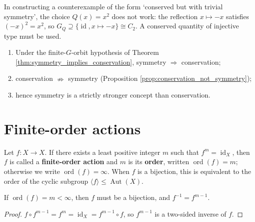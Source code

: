 \begin{remark}\label{rem:counterexample_fix}
In constructing a counterexample of the form `conserved but with trivial symmetry', the choice $Q(x)=x^2$ does not work: the reflection $x\mapsto -x$ satisfies $(-x)^2=x^2$, so $G_Q\supseteq\{\operatorname{id},x\mapsto -x\}\cong C_2$. A conserved quantity of injective type must be used.
\end{remark}

\begin{corollary}\label{cor:conservation_symmetry_hierarchy}
\begin{enumerate}[label=(\roman*)]
    \item Under the finite-$G$-orbit hypothesis of Theorem \ref{thm:symmetry_implies_conservation}, symmetry $\Rightarrow$ conservation;
    \item conservation $\nRightarrow$ symmetry (Proposition \ref{prop:conservation_not_symmetry});
    \item hence symmetry is a strictly stronger concept than conservation.
\end{enumerate}
\end{corollary}

\section{Finite-order actions}

\begin{definition}\label{def:map_order}
Let $f:X\to X$. If there exists a least positive integer $m$ such that $f^m=\operatorname{id}_X$, then $f$ is called a \textbf{finite-order action} and $m$ is its \textbf{order}, written $\operatorname{ord}(f)=m$; otherwise we write $\operatorname{ord}(f)=\infty$. When $f$ is a bijection, this is equivalent to the order of the cyclic subgroup $\langle f\rangle\le\operatorname{Aut}(X)$.
\end{definition}

\begin{lemma}\label{lem:finite_order_bijective}
If $\operatorname{ord}(f)=m<\infty$, then $f$ must be a bijection, and $f^{-1}=f^{m-1}$.
\end{lemma}

\begin{proof}
$f\circ f^{m-1}=f^m=\operatorname{id}_X=f^{m-1}\circ f$, so $f^{m-1}$ is a two-sided inverse of $f$.
\end{proof}

